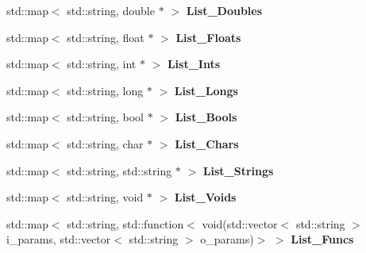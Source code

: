 \begin{DoxyCompactItemize}
\item 
\mbox{\label{class_shared___memory_a319123cd69aac705bcc43b071f9dc21c}} 
std\+::map$<$ std\+::string, double $\ast$ $>$ {\bfseries List\+\_\+\+Doubles}
\item 
\mbox{\label{class_shared___memory_a153131243072a8bd88a9361e16f84473}} 
std\+::map$<$ std\+::string, float $\ast$ $>$ {\bfseries List\+\_\+\+Floats}
\item 
\mbox{\label{class_shared___memory_ac9a6608511056e00f726d2b7ffe7696e}} 
std\+::map$<$ std\+::string, int $\ast$ $>$ {\bfseries List\+\_\+\+Ints}
\item 
\mbox{\label{class_shared___memory_a3f22062cdd9ce8e6259aa3929f3bffb4}} 
std\+::map$<$ std\+::string, long $\ast$ $>$ {\bfseries List\+\_\+\+Longs}
\item 
\mbox{\label{class_shared___memory_ae452e5b93bc5c8068ea06a9375bd7ba7}} 
std\+::map$<$ std\+::string, bool $\ast$ $>$ {\bfseries List\+\_\+\+Bools}
\item 
\mbox{\label{class_shared___memory_a554c2ceb1bfdd15aff4ef99c9ef9e52d}} 
std\+::map$<$ std\+::string, char $\ast$ $>$ {\bfseries List\+\_\+\+Chars}
\item 
\mbox{\label{class_shared___memory_aab4d6f0ea3556d678d2ddca9783475d2}} 
std\+::map$<$ std\+::string, std\+::string $\ast$ $>$ {\bfseries List\+\_\+\+Strings}
\item 
\mbox{\label{class_shared___memory_a2985f2c3d83e9035e50ca2eae5eed0b8}} 
std\+::map$<$ std\+::string, void $\ast$ $>$ {\bfseries List\+\_\+\+Voids}
\item 
\mbox{\label{class_shared___memory_aae8d26d1cc1344574471397191a17c23}} 
std\+::map$<$ std\+::string, std\+::function$<$ void(std\+::vector$<$ std\+::string $>$ i\+\_\+params, std\+::vector$<$ std\+::string $>$ o\+\_\+params)$>$ $>$ {\bfseries List\+\_\+\+Funcs}
\end{DoxyCompactItemize}

